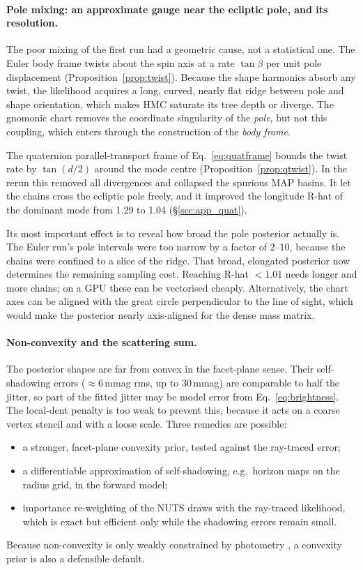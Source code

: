 \documentclass[11pt,a4paper]{article}
\theoremstyle{remark}
\begin{document}
\paragraph{Pole mixing: an approximate gauge near the ecliptic pole, and its resolution.} The poor
mixing of the first run had a geometric cause, not a statistical one. The Euler body frame twists about
the spin axis at a rate $\tan\beta$ per unit pole displacement (Proposition~\ref{prop:twist}). Because
the shape harmonics absorb any twist, the likelihood acquires a long, curved, nearly flat ridge between
pole and shape orientation, which makes HMC saturate its tree depth or diverge. The gnomonic chart
removes the coordinate singularity of the \emph{pole}, but not this coupling, which enters through the
construction of the \emph{body frame}.

The quaternion parallel-transport frame of Eq.~\eqref{eq:quatframe} bounds the twist rate by
$\tan(d/2)$ around the mode centre (Proposition~\ref{prop:qtwist}). In the rerun this removed all
divergences and collapsed the spurious MAP basins. It let the chains cross the ecliptic pole freely, and
it improved the longitude R-hat of the dominant mode from 1.29 to 1.04 (\S\ref{sec:app_quat}).

Its most important effect is to reveal how broad the pole posterior actually is. The Euler run's pole
intervals were too narrow by a factor of 2--10, because the chains were confined to a slice of the
ridge. That broad, elongated posterior now determines the remaining sampling cost. Reaching R-hat
$<1.01$ needs longer and more chains; on a GPU these can be vectorised cheaply. Alternatively, the chart
axes can be aligned with the great circle perpendicular to the line of sight, which would make the
posterior nearly axis-aligned for the dense mass matrix.

\paragraph{Non-convexity and the scattering sum.} The posterior shapes are far from convex in the
facet-plane sense. Their self-shadowing errors ($\approx6$\,mmag rms, up to 30\,mmag) are comparable to
half the jitter, so part of the fitted jitter may be model error from Eq.~\eqref{eq:brightness}. The
local-dent penalty is too weak to prevent this, because it acts on a coarse vertex stencil and with a
loose scale. Three remedies are possible:
\begin{itemize}[nosep]
\item a stronger, facet-plane convexity prior, tested against the ray-traced error;
\item a differentiable approximation of self-shadowing, e.g.\ horizon maps on the radius grid, in the
  forward model;
\item importance re-weighting of the NUTS draws with the ray-traced likelihood, which is exact but
  efficient only while the shadowing errors remain small.
\end{itemize}
Because non-convexity is only weakly constrained by photometry \citep{durech2003}, a convexity prior is
also a defensible default.
\end{document}
